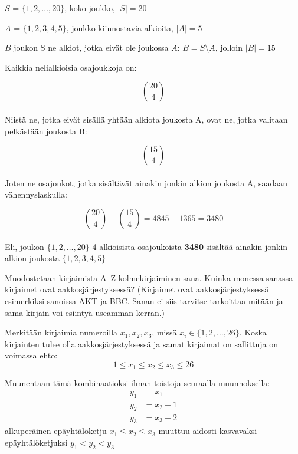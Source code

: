 \documentclass[12pt,a4paper]{article}
\begin{document}
\begin{kuvaus}
  \item $S$ = $\{1,2,\ldots,20\}$, koko joukko, $|S| = 20$
  \item $A$ = $\{1, 2, 3, 4, 5\}$, joukko kiinnostavia alkioita, $|A| = 5$
  \item $B$ joukon S ne alkiot, jotka eivät ole joukossa
  $A$: $B = S \setminus A$, jolloin $|B| = 15$
\end{kuvaus}

Kaikkia nelialkioisia osajoukkoja on:

\[
\binom{20}{4}
\]
\\
Niistä ne, jotka eivät sisällä yhtään alkiota joukosta A,
ovat ne, jotka valitaan pelkästään joukosta B:

\[
\binom{15}{4}
\]
\\
Joten ne osajoukot, jotka sisältävät ainakin jonkin alkion joukosta
A, saadaan vähennyslaskulla:

\[
\binom{20}{4} - \binom{15}{4} = 4845 - 1365 = 3480
\]
\\
Eli, joukon $\{1,2,\ldots,20\}$ 4-alkioisista osajoukoista \textbf{3480} sisältää ainakin jonkin alkion joukosta $\{1, 2, 3, 4, 5\}$








\newpage
{}

Muodostetaan kirjaimista A--Z kolmekirjaiminen sana. Kuinka monessa sanassa kirjaimet ovat aakkosjärjestyksessä? (Kirjaimet ovat aakkosjärjestyksessä esimerkiksi sanoissa AKT ja BBC. Sanan ei siis tarvitse tarkoittaa mitään ja sama kirjain voi esiintyä useamman kerran.)

\vspace{0.4cm}

Merkitään kirjaimia numeroilla $x_1, x_2, x_3$, missä $x_i \in \{1, 2, \ldots, 26\}$.
Koska kirjainten tulee olla aakkosjärjestyksessä ja samat kirjaimat on sallittuja on voimassa ehto:
\[
1 \le x_1 \le x_2 \le x_3 \le 26
\]

Muunentaan tämä kombinaatioksi ilman toistoja seuraalla muunnoksella:
\begin{align*}
y_1 &= x_1 \\
y_2 &= x_2 + 1 \\
y_3 &= x_3 + 2
\end{align*}
alkuperäinen epäyhtälöketju $x_1 \le x_2 \le x_3$ muuttuu aidosti kasvavaksi epäyhtälöketjuksi $y_1 < y_2 < y_3$\\
\end{document}
